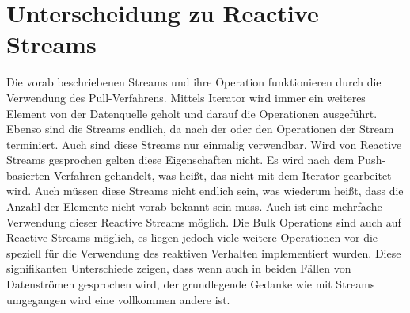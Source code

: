 \section{Unterscheidung zu Reactive Streams}
Die vorab beschriebenen Streams und ihre Operation funktionieren durch die Verwendung des Pull-Verfahrens. Mittels Iterator wird immer ein weiteres Element von der Datenquelle geholt und darauf die Operationen ausgeführt. Ebenso sind die Streams endlich, da nach der oder den Operationen der Stream terminiert. Auch sind diese Streams nur einmalig verwendbar. Wird von Reactive Streams gesprochen gelten diese Eigenschaften nicht. Es wird nach dem Push-basierten Verfahren gehandelt, was heißt, das nicht mit dem Iterator gearbeitet wird. Auch müssen diese Streams nicht endlich sein, was wiederum heißt, dass die Anzahl der Elemente nicht vorab bekannt sein muss. Auch ist eine mehrfache Verwendung dieser Reactive Streams möglich. Die Bulk Operations sind auch auf Reactive Streams möglich, es liegen jedoch viele weitere Operationen vor die speziell für die Verwendung des reaktiven Verhalten implementiert wurden. Diese signifikanten Unterschiede zeigen, dass wenn auch in beiden Fällen von Datenströmen gesprochen wird, der grundlegende Gedanke wie mit Streams umgegangen wird eine vollkommen andere ist.